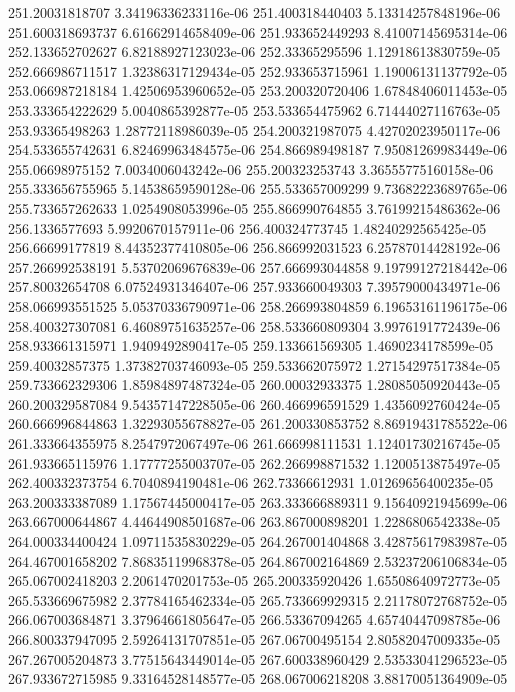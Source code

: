 {251.20031818707 3.34196336233116e-06
251.400318440403 5.13314257848196e-06
251.600318693737 6.61662914658409e-06
251.933652449293 8.41007145695314e-06
252.133652702627 6.82188927123023e-06
252.33365295596 1.12918613830759e-05
252.666986711517 1.32386317129434e-05
252.933653715961 1.19006131137792e-05
253.066987218184 1.42506953960652e-05
253.200320720406 1.67848406011453e-05
253.333654222629 5.0040865392877e-05
253.533654475962 6.71444027116763e-05
253.93365498263 1.28772118986039e-05
254.200321987075 4.42702023950117e-06
254.533655742631 6.82469963484575e-06
254.866989498187 7.95081269983449e-06
255.06698975152 7.0034006043242e-06
255.200323253743 3.36555775160158e-06
255.333656755965 5.14538659590128e-06
255.533657009299 9.73682223689765e-06
255.733657262633 1.0254908053996e-05
255.866990764855 3.76199215486362e-06
256.1336577693 5.9920670157911e-06
256.400324773745 1.48240292565425e-05
256.66699177819 8.44352377410805e-06
256.866992031523 6.25787014428192e-06
257.266992538191 5.53702069676839e-06
257.666993044858 9.19799127218442e-06
257.80032654708 6.07524931346407e-06
257.933660049303 7.39579000434971e-06
258.066993551525 5.05370336790971e-06
258.266993804859 6.19653161196175e-06
258.400327307081 6.46089751635257e-06
258.533660809304 3.9976191772439e-06
258.933661315971 1.9409492890417e-05
259.133661569305 1.4690234178599e-05
259.40032857375 1.37382703746093e-05
259.533662075972 1.27154297517384e-05
259.733662329306 1.85984897487324e-05
260.00032933375 1.28085050920443e-05
260.200329587084 9.54357147228505e-06
260.466996591529 1.4356092760424e-05
260.666996844863 1.32293055678827e-05
261.200330853752 8.86919431785522e-06
261.333664355975 8.2547972067497e-06
261.666998111531 1.12401730216745e-05
261.933665115976 1.17777255003707e-05
262.266998871532 1.1200513875497e-05
262.400332373754 6.7040894190481e-06
262.73366612931 1.01269656400235e-05
263.200333387089 1.17567445000417e-05
263.333666889311 9.15640921945699e-06
263.667000644867 4.44644908501687e-06
263.867000898201 1.2286806542338e-05
264.000334400424 1.09711535830229e-05
264.267001404868 3.42875617983987e-05
264.467001658202 7.86835119968378e-05
264.867002164869 2.53237206106834e-05
265.067002418203 2.2061470201753e-05
265.200335920426 1.65508640972773e-05
265.533669675982 2.37784165462334e-05
265.733669929315 2.21178072768752e-05
266.067003684871 3.37964661805647e-05
266.53367094265 4.65740447098785e-06
266.800337947095 2.59264131707851e-05
267.06700495154 2.80582047009335e-05
267.267005204873 3.77515643449014e-05
267.600338960429 2.53533041296523e-05
267.933672715985 9.33164528148577e-05
268.067006218208 3.88170051364909e-05
}
